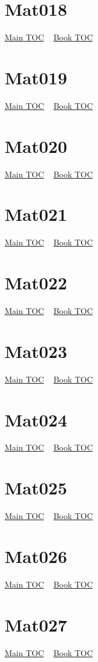 \documentclass{book}
\begin{document}
  \section{Mat018}\hyperlink{toc}{Main TOC} ~ \hyperref[subsec:Mat]{Book TOC} 
  \section{Mat019}\hyperlink{toc}{Main TOC} ~ \hyperref[subsec:Mat]{Book TOC} 
  \section{Mat020}\hyperlink{toc}{Main TOC} ~ \hyperref[subsec:Mat]{Book TOC} 
  \section{Mat021}\hyperlink{toc}{Main TOC} ~ \hyperref[subsec:Mat]{Book TOC} 
  \section{Mat022}\hyperlink{toc}{Main TOC} ~ \hyperref[subsec:Mat]{Book TOC} 
  \section{Mat023}\hyperlink{toc}{Main TOC} ~ \hyperref[subsec:Mat]{Book TOC} 
  \section{Mat024}\hyperlink{toc}{Main TOC} ~ \hyperref[subsec:Mat]{Book TOC} 
  \section{Mat025}\hyperlink{toc}{Main TOC} ~ \hyperref[subsec:Mat]{Book TOC} 
  \section{Mat026}\hyperlink{toc}{Main TOC} ~ \hyperref[subsec:Mat]{Book TOC} 
  \section{Mat027}\hyperlink{toc}{Main TOC} ~ \hyperref[subsec:Mat]{Book TOC} 
\end{document}
